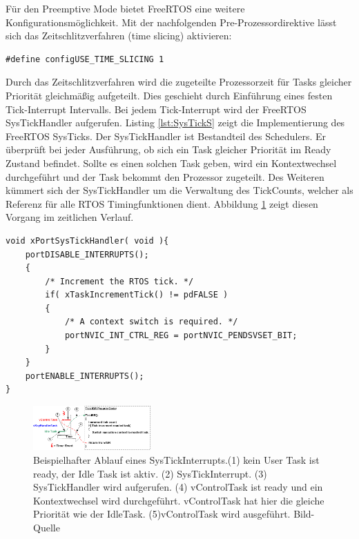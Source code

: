 Für den Preemptive Mode bietet FreeRTOS eine weitere Konfigurationsmöglichkeit. Mit der nachfolgenden Pre-Prozessordirektive lässt sich das Zeitschlitzverfahren (time slicing) aktivieren: 
\begin{lstlisting}[numbers = none]
#define configUSE_TIME_SLICING 1
\end{lstlisting}
Durch das Zeitschlitzverfahren wird die zugeteilte Prozessorzeit für Tasks gleicher Priorität gleichmäßig aufgeteilt. Dies geschieht durch Ein\-füh\-rung eines festen Tick-Interrupt Intervalls. Bei jedem Tick-Interrupt wird der FreeRTOS SysTickHandler aufgerufen. Listing \ref{lst:SysTickS} zeigt die Implementierung des FreeRTOS SysTicks. Der SysTickHandler ist Bestandteil des Schedulers. Er überprüft bei jeder Ausführung, ob sich ein Task gleicher Priorität im Ready Zustand befindet. Sollte es einen solchen Task geben, wird ein Kontextwechsel durchgeführt und der Task bekommt den Prozessor zugeteilt. Des Weiteren kümmert sich der SysTickHandler um die Verwaltung des TickCounts, welcher als Referenz für alle RTOS Timingfunktionen dient. Abbildung \ref{fig:SysTick} zeigt diesen Vorgang im zeitlichen Verlauf.
\begin{lstlisting}[caption={FreeRTOS Source des SysTickHandlers aus Task.c. Der SysTickHandler verwaltet den TickCount. Der TickCount dient allen Timingfunktionen des RTOS Kernels als Zeitreferenz. Des Weiteren wird beim aktiven Time Slicing überprüft, ob ein Kontextwechsel nötig ist. Der Kontextwechsel wird dann ggf. durch den PendSVHandler durchgeführt.}, linewidth=8cm,captionpos=b, label=lst:SysTickS, float=hbt]
void xPortSysTickHandler( void ){
	portDISABLE_INTERRUPTS();
	{
		/* Increment the RTOS tick. */
		if( xTaskIncrementTick() != pdFALSE )
		{
			/* A context switch is required. */
			portNVIC_INT_CTRL_REG = portNVIC_PENDSVSET_BIT;
		}
	}
	portENABLE_INTERRUPTS();
}
\end{lstlisting}
\begin{figure}[htb]
	\centering
		\includegraphics[width=0.4\textwidth]{Pictures/FreeRTOSOrg/TickISR.png}
	\caption{Beispielhafter Ablauf eines SysTickInterrupts.(1) kein User Task ist ready, der Idle Task ist aktiv. (2) SysTickInterrupt. (3) SysTickHandler wird aufgerufen. (4) vControlTask ist ready und ein Kontextwechsel wird durchgeführt. vControlTask hat hier die gleiche Priorität wie der IdleTask. (5)vControlTask wird ausgeführt. Bild-Quelle~\protect{}}
	\label{fig:SysTick}
\end{figure}
